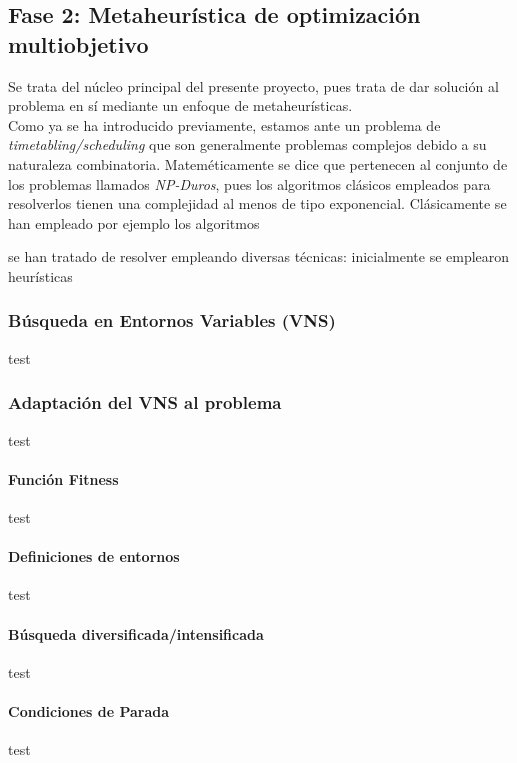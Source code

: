 \subsection{Fase 2: Metaheurística de optimización multiobjetivo} \label{sec:3:metaheurística}
Se trata del núcleo principal del presente proyecto, pues trata de dar solución al problema en sí mediante un enfoque de metaheurísticas.
\\

Como ya se ha introducido previamente, estamos ante un problema de \textit{timetabling/scheduling} que son generalmente problemas complejos debido a su naturaleza combinatoria. 
Mateméticamente se dice que pertenecen al conjunto de los problemas llamados \textit{NP-Duros}, pues los algoritmos clásicos empleados para resolverlos tienen una complejidad al menos de tipo exponencial. Clásicamente se han empleado por ejemplo los algoritmos 





se han tratado de resolver empleando diversas técnicas: inicialmente se emplearon heurísticas

\subsubsection{Búsqueda en Entornos Variables (VNS)}
test
\subsubsection{Adaptación del VNS al problema}
test
\paragraph{Función Fitness} 
test

\paragraph{Definiciones de entornos}
test

\paragraph{Búsqueda diversificada/intensificada}
test

\paragraph{Condiciones de Parada}
test










